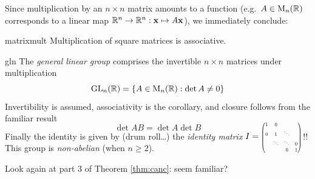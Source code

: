 	
\goodbreak

Since multiplication by an $n\times n$ matrix amounts to a function (e.g.\ $A\in \mathrm{M}_n(\mathbb{R})$ corresponds to a linear map $\mathbb{R}^n\to\mathbb{R}^n:{\mathbf{x}}\mapsto A{\mathbf{x}}$), we immediately conclude:

\begin{cor}{}{matrixmult}
Multiplication of square matrices is associative.
\end{cor}

\begin{example}{}{gln}
The \emph{general linear group} comprises the invertible $n\times n$ matrices under multiplication
\[\mathrm{GL}_n(\mathbb{R})=\{A\in \mathrm{M}_n(\mathbb{R}):\det A\neq 0\}\]
Invertibility is assumed, associativity is the corollary, and closure follows from the familiar result
\[\det AB=\det A\det B\]
Finally the identity is given by (drum roll\ldots) the \emph{identity matrix} $I=\smash{\scalebox{0.6}{$\begin{pmatrix}
1&0&&\\
0&1&\ddots&\\
&\ddots&\ddots&0\\
&&0&1
\end{pmatrix}$}}$!!\smallbreak
This group is \emph{non-abelian} (when $n\ge 2$).
\end{example}

Look again at part 3 of Theorem \ref{thm:canc}: seem familiar?


% 


